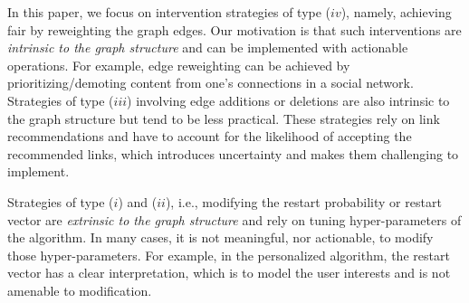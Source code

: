 \documentclass[sigconf, anonymous, review]{acmart}
\begin{document}
In this paper, we focus on intervention strategies of type ($iv$),
namely, achieving fair \pagerank by re\-weighting the graph edges.
Our motivation is that such interventions are 
\emph{intrinsic to the graph structure} and can be implemented with actionable operations. 
For example, edge re\-weighting can be achieved by prioritizing/demoting content from one's connections in a social network. Strategies of type ($iii$) involving edge additions or deletions are also intrinsic to the graph structure but tend to be less practical. These strategies rely on link recommendations and have to account for the likelihood of accepting the recommended links, which introduces uncertainty and makes them challenging to implement.

Strategies of type ($i$) and ($ii$), i.e., modifying the \pagerank restart probability or restart vector are \emph{extrinsic to the graph structure} and rely on tuning hyper-parameters of the \pagerank algorithm. In many cases, it is not meaningful, nor actionable, to modify those hyper-parameters. For example, in the personalized \pagerank algorithm, the restart vector has a clear interpretation, which is to model the user interests and is not amenable to modification.



\end{document}
